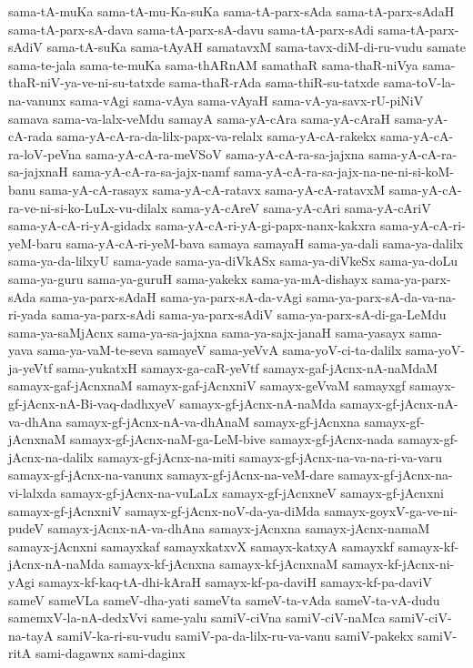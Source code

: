 {sama-tA-muKa
sama-tA-mu-Ka-suKa
sama-tA-parx-sAda
sama-tA-parx-sAdaH
sama-tA-parx-sA-dava
sama-tA-parx-sA-davu
sama-tA-parx-sAdi
sama-tA-parx-sAdiV
sama-tA-suKa
sama-tAyAH
samatavxM
sama-tavx-diM-di-ru-vudu
samate
sama-te-jala
sama-te-muKa
sama-thARnAM
samathaR
sama-thaR-niVya
sama-thaR-niV-ya-ve-ni-su-tatxde
sama-thaR-rAda
sama-thiR-su-tatxde
sama-toV-la-na-vanunx
sama-vAgi
sama-vAya
sama-vAyaH
sama-vA-ya-savx-rU-piNiV
samava
sama-va-lalx-veMdu
samayA
sama-yA-cAra
sama-yA-cAraH
sama-yA-cA-rada
sama-yA-cA-ra-da-lilx-papx-va-relalx
sama-yA-cA-rakekx
sama-yA-cA-ra-loV-peVna
sama-yA-cA-ra-meVSoV
sama-yA-cA-ra-sa-jajxna
sama-yA-cA-ra-sa-jajxnaH
sama-yA-cA-ra-sa-jajx-namf
sama-yA-cA-ra-sa-jajx-na-ne-ni-si-koM-banu
sama-yA-cA-rasayx
sama-yA-cA-ratavx
sama-yA-cA-ratavxM
sama-yA-cA-ra-ve-ni-si-ko-LuLx-vu-dilalx
sama-yA-cAreV
sama-yA-cAri
sama-yA-cAriV
sama-yA-cA-ri-yA-gidadx
sama-yA-cA-ri-yA-gi-papx-nanx-kakxra
sama-yA-cA-ri-yeM-baru
sama-yA-cA-ri-yeM-bava
samaya
samayaH
sama-ya-dali
sama-ya-dalilx
sama-ya-da-lilxyU
sama-yade
sama-ya-diVkASx
sama-ya-diVkeSx
sama-ya-doLu
sama-ya-guru
sama-ya-guruH
sama-yakekx
sama-ya-mA-dishayx
sama-ya-parx-sAda
sama-ya-parx-sAdaH
sama-ya-parx-sA-da-vAgi
sama-ya-parx-sA-da-va-na-ri-yada
sama-ya-parx-sAdi
sama-ya-parx-sAdiV
sama-ya-parx-sA-di-ga-LeMdu
sama-ya-saMjAcnx
sama-ya-sa-jajxna
sama-ya-sajx-janaH
sama-yasayx
sama-yava
sama-ya-vaM-te-seva
samayeV
sama-yeVvA
sama-yoV-ci-ta-dalilx
sama-yoV-ja-yeVtf
sama-yukatxH
samayx-ga-caR-yeVtf
samayx-gaf-jAcnx-nA-naMdaM
samayx-gaf-jAcnxnaM
samayx-gaf-jAcnxniV
samayx-geVvaM
samayxgf
samayx-gf-jAcnx-nA-Bi-vaq-dadhxyeV
samayx-gf-jAcnx-nA-naMda
samayx-gf-jAcnx-nA-va-dhAna
samayx-gf-jAcnx-nA-va-dhAnaM
samayx-gf-jAcnxna
samayx-gf-jAcnxnaM
samayx-gf-jAcnx-naM-ga-LeM-bive
samayx-gf-jAcnx-nada
samayx-gf-jAcnx-na-dalilx
samayx-gf-jAcnx-na-miti
samayx-gf-jAcnx-na-va-na-ri-va-varu
samayx-gf-jAcnx-na-vanunx
samayx-gf-jAcnx-na-veM-dare
samayx-gf-jAcnx-na-vi-lalxda
samayx-gf-jAcnx-na-vuLaLx
samayx-gf-jAcnxneV
samayx-gf-jAcnxni
samayx-gf-jAcnxniV
samayx-gf-jAcnx-noV-da-ya-diMda
samayx-goyxV-ga-ve-ni-pudeV
samayx-jAcnx-nA-va-dhAna
samayx-jAcnxna
samayx-jAcnx-namaM
samayx-jAcnxni
samayxkaf
samayxkatxvX
samayx-katxyA
samayxkf
samayx-kf-jAcnx-nA-naMda
samayx-kf-jAcnxna
samayx-kf-jAcnxnaM
samayx-kf-jAcnx-ni-yAgi
samayx-kf-kaq-tA-dhi-kAraH
samayx-kf-pa-daviH
samayx-kf-pa-daviV
sameV
sameVLa
sameV-dha-yati
sameVta
sameV-ta-vAda
sameV-ta-vA-dudu
samemxV-la-nA-dedxVvi
same-yalu
samiV-ciVna
samiV-ciV-naMca
samiV-ciV-na-tayA
samiV-ka-ri-su-vudu
samiV-pa-da-lilx-ru-va-vanu
samiV-pakekx
samiV-ritA
sami-dagawnx
sami-daginx
}
